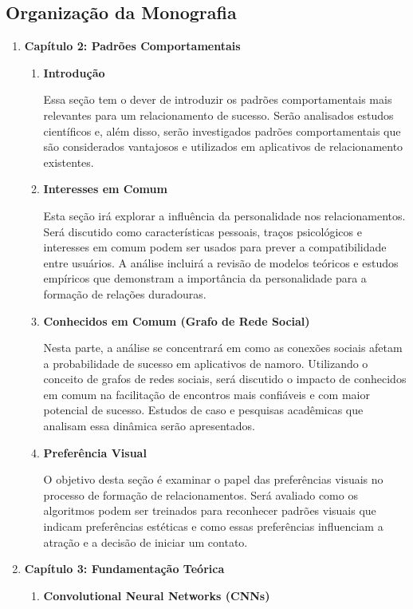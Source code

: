 \subsection{Organização da Monografia}
\begin{enumerate}
    \item \textbf{Capítulo 2: Padrões Comportamentais}
    \begin{enumerate}
        \item \textbf{Introdução}
        
        Essa seção tem o dever de introduzir os padrões comportamentais mais relevantes para um relacionamento de sucesso. Serão analisados estudos científicos e, além disso, serão investigados padrões comportamentais que são considerados vantajosos e utilizados em aplicativos de relacionamento existentes.

        \item \textbf{Interesses em Comum}
        
        Esta seção irá explorar a influência da personalidade nos relacionamentos. Será discutido como características pessoais, traços psicológicos e interesses em comum podem ser usados para prever a compatibilidade entre usuários. A análise incluirá a revisão de modelos teóricos e estudos empíricos que demonstram a importância da personalidade para a formação de relações duradouras.

        \item \textbf{Conhecidos em Comum (Grafo de Rede Social)}
        
        Nesta parte, a análise se concentrará em como as conexões sociais afetam a probabilidade de sucesso em aplicativos de namoro. Utilizando o conceito de grafos de redes sociais, será discutido o impacto de conhecidos em comum na facilitação de encontros mais confiáveis e com maior potencial de sucesso. Estudos de caso e pesquisas acadêmicas que analisam essa dinâmica serão apresentados.

        \item \textbf{Preferência Visual}
        
        O objetivo desta seção é examinar o papel das preferências visuais no processo de formação de relacionamentos. Será avaliado como os algoritmos podem ser treinados para reconhecer padrões visuais que indicam preferências estéticas e como essas preferências influenciam a atração e a decisão de iniciar um contato.
    \end{enumerate}

    \item \textbf{Capítulo 3: Fundamentação Teórica}
    \begin{enumerate}
        \item \textbf{Convolutional Neural Networks (CNNs)}
        

\end{enumerate}
\end{enumerate}
